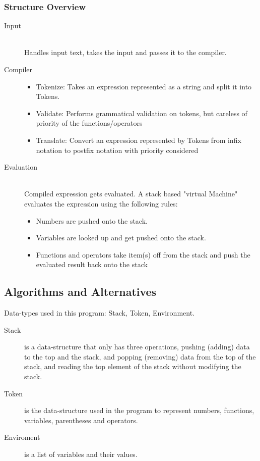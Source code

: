 \documentclass[12pt,a4paper]{article}
\begin{document}
\subsubsection{Structure Overview}
\begin{description}
  \item [Input] \hfill \\Handles input text, takes the input and passes it to the compiler.
  \item [Compiler] \hfill
  \begin{itemize}
    \item Tokenize: Takes an expression represented as a string and split it into Tokens.
    \item Validate: Performs grammatical validation on tokens, but careless of priority of the functions/operators \change
    \item Translate: Convert an expression represented by Tokens from infix notation to postfix notation with priority considered \change
  \end{itemize}    
  \item [Evaluation] \hfill \\ Compiled expression gets evaluated. A stack based "virtual Machine" evaluates the expression using the following rules:
  \begin {itemize}
    \item Numbers are pushed onto the stack.
    \item Variables are looked up and get pushed onto the stack.
    \item Functions and operators take item(s) off from the stack and push the evaluated result back onto the stack
  \end {itemize}
\end{description}


\iffalse
En mer detaljerad beskrivning (design)
- Vilka delar består systemet av? Hur samverkar de för att lösa problemet?

- Vilka datastrukturer används? Beskriv abstrakta datatyper (gränssnitt/interface)
\fi

\subsection{Algorithms and Alternatives}
\textnormal{ Data-types used in this program: Stack, Token, Environment.}
\begin{description}
  \item [Stack] is a data-structure that only has three operations, pushing (adding) data to the top and the stack, and popping (removing) 
  data from the top of the stack, and reading the top element of the stack without modifying the stack.

  \item[Token] is the data-structure used in the program to represent numbers, functions, variables, parentheses and operators.

  \item[Enviroment] is a list of variables and their values.
\end{description}
\end{document}
